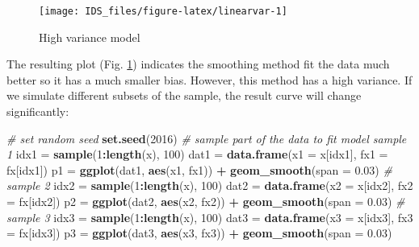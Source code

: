 \documentclass[12pt,]{krantz}
\makeatletter
\newenvironment{Shaded}{\begin{snugshade}}{\end{snugshade}}
\newcommand{\CommentTok}[1]{\textcolor[rgb]{0.37,0.37,0.37}{\textit{#1}}}
\newcommand{\DataTypeTok}[1]{\textcolor[rgb]{0.27,0.27,0.27}{#1}}
\newcommand{\DecValTok}[1]{\textcolor[rgb]{0.06,0.06,0.06}{#1}}
\newcommand{\FloatTok}[1]{\textcolor[rgb]{0.06,0.06,0.06}{#1}}
\newcommand{\KeywordTok}[1]{\textcolor[rgb]{0.27,0.27,0.27}{\textbf{#1}}}
\newcommand{\NormalTok}[1]{#1}
\newcommand{\OperatorTok}[1]{\textcolor[rgb]{0.43,0.43,0.43}{\textbf{#1}}}
\newcommand{\StringTok}[1]{\textcolor[rgb]{0.5,0.5,0.5}{#1}}
\newenvironment{kframe}{%
\medskip{}
\setlength{\fboxsep}{.8em}
 \def\at@end@of@kframe{}%
 \ifinner\ifhmode%
  \def\at@end@of@kframe{\end{minipage}}%
  \begin{minipage}{\columnwidth}%
 \fi\fi%
 \def\FrameCommand##1{\hskip\@totalleftmargin \hskip-\fboxsep
 \colorbox{shadecolor}{##1}\hskip-\fboxsep
     \hskip-\linewidth \hskip-\@totalleftmargin \hskip\columnwidth}%
 \MakeFramed {\advance\hsize-\width
   \@totalleftmargin\z@ \linewidth\hsize
   \@setminipage}}%
 {\par\unskip\endMakeFramed%
 \at@end@of@kframe}
\renewenvironment{Shaded}{\begin{kframe}}{\end{kframe}}
\makeatother
\begin{document}
\begin{figure}

{\centering \texttt{[image: IDS\_files/figure-latex/linearvar-1]} 

}

\caption{High variance model}\label{fig:linearvar}
\end{figure}

The resulting plot (Fig. \ref{fig:linearvar}) indicates the smoothing method fit the data much better so it has a much smaller bias. However, this method has a high variance. If we simulate different subsets of the sample, the result curve will change significantly:

\begin{Shaded}
\begin{Highlighting}[]
\CommentTok{# set random seed}
\KeywordTok{set.seed}\NormalTok{(}\DecValTok{2016}\NormalTok{)}
\CommentTok{# sample part of the data to fit model sample 1}
\NormalTok{idx1 =}\StringTok{ }\KeywordTok{sample}\NormalTok{(}\DecValTok{1}\OperatorTok{:}\KeywordTok{length}\NormalTok{(x), }\DecValTok{100}\NormalTok{)}
\NormalTok{dat1 =}\StringTok{ }\KeywordTok{data.frame}\NormalTok{(}\DataTypeTok{x1 =}\NormalTok{ x[idx1], }\DataTypeTok{fx1 =}\NormalTok{ fx[idx1])}
\NormalTok{p1 =}\StringTok{ }\KeywordTok{ggplot}\NormalTok{(dat1, }\KeywordTok{aes}\NormalTok{(x1, fx1)) }\OperatorTok{+}\StringTok{ }\KeywordTok{geom_smooth}\NormalTok{(}\DataTypeTok{span =} \FloatTok{0.03}\NormalTok{)}
\CommentTok{# sample 2}
\NormalTok{idx2 =}\StringTok{ }\KeywordTok{sample}\NormalTok{(}\DecValTok{1}\OperatorTok{:}\KeywordTok{length}\NormalTok{(x), }\DecValTok{100}\NormalTok{)}
\NormalTok{dat2 =}\StringTok{ }\KeywordTok{data.frame}\NormalTok{(}\DataTypeTok{x2 =}\NormalTok{ x[idx2], }\DataTypeTok{fx2 =}\NormalTok{ fx[idx2])}
\NormalTok{p2 =}\StringTok{ }\KeywordTok{ggplot}\NormalTok{(dat2, }\KeywordTok{aes}\NormalTok{(x2, fx2)) }\OperatorTok{+}\StringTok{ }\KeywordTok{geom_smooth}\NormalTok{(}\DataTypeTok{span =} \FloatTok{0.03}\NormalTok{)}
\CommentTok{# sample 3}
\NormalTok{idx3 =}\StringTok{ }\KeywordTok{sample}\NormalTok{(}\DecValTok{1}\OperatorTok{:}\KeywordTok{length}\NormalTok{(x), }\DecValTok{100}\NormalTok{)}
\NormalTok{dat3 =}\StringTok{ }\KeywordTok{data.frame}\NormalTok{(}\DataTypeTok{x3 =}\NormalTok{ x[idx3], }\DataTypeTok{fx3 =}\NormalTok{ fx[idx3])}
\NormalTok{p3 =}\StringTok{ }\KeywordTok{ggplot}\NormalTok{(dat3, }\KeywordTok{aes}\NormalTok{(x3, fx3)) }\OperatorTok{+}\StringTok{ }\KeywordTok{geom_smooth}\NormalTok{(}\DataTypeTok{span =} \FloatTok{0.03}\NormalTok{)}

\end{Highlighting}
\end{Shaded}
\end{document}
